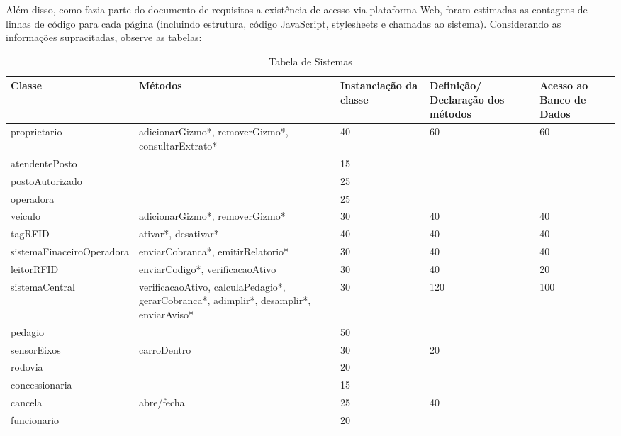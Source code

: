 \documentclass[
10pt, %
a4paper, %
oneside, %
headinclude,footinclude, %
BCOR5mm, %
]{scrartcl}
\begin{document}
Além disso, como fazia parte do documento de requisitos a existência de acesso
via plataforma Web, foram estimadas as contagens de linhas de código para cada
página (incluindo estrutura, código JavaScript, stylesheets e chamadas ao
sistema). Considerando as informações supracitadas, observe as tabelas:
\begin{table}[!h]
	\begin{adjustwidth}{-1.4cm}{}
	\begin{tabular}{p{4cm} p{2.8cm} p{2cm} p{2cm} p{1.5cm}}
		\hline\hline
		Classe & Métodos & Instanciação da classe & Definição/ Declaração dos métodos & Acesso ao Banco de Dados\\ 
		\hline\hline
		proprietario & adicionarGizmo*, removerGizmo*, consultarExtrato* & 40 & 60 & 60\\ 
		\hline
		atendentePosto &  & 15 &  & \\ 
		\hline
		postoAutorizado &  & 25 &  & \\ 
		\hline
		operadora &  & 25 &  & \\ 
		\hline
		veiculo & adicionarGizmo*, removerGizmo* & 30 & 40 & 40\\ 
		\hline
		tagRFID & ativar*, desativar* & 40 & 40 & 40\\ 
		\hline
		sistemaFinaceiroOperadora & enviarCobranca*, emitirRelatorio* & 30 & 40 & 40\\ 
		\hline
		leitorRFID & enviarCodigo*, verificacaoAtivo & 30 & 40 & 20\\ 
		\hline
		sistemaCentral & verificacaoAtivo, calculaPedagio*, gerarCobranca*, adimplir*, desamplir*, enviarAviso* & 30 & 120 & 100\\ 
		\hline
		pedagio &  & 50 &  & \\ 
		\hline
		sensorEixos & carroDentro & 30 & 20 & \\ 
		\hline
		rodovia &  & 20 &  & \\ 
		\hline
		concessionaria &  & 15 &  & \\ 
		\hline
		cancela & abre/fecha & 25 & 40 & \\ 
		\hline
		funcionario &  & 20 &  & \\ 
		\hline
	\hline\end{tabular}
	\end{adjustwidth}
	\caption{\small{Tabela de Sistemas}} 
	\label{table:t1}
\end{table}

{\let\thefootnote\relax{}}
\end{document}
